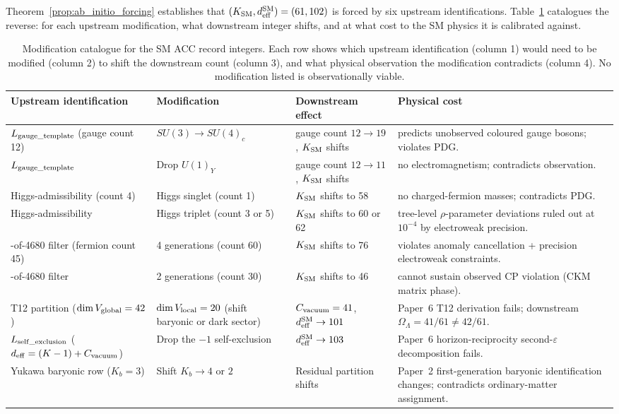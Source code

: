 \documentclass[11pt]{article}
\theoremstyle{plain}
\theoremstyle{definition}
\theoremstyle{remark}
\begin{document}
Theorem~\ref{prop:ab_initio_forcing} establishes that $(K_{\rm SM}, d_{\rm eff}^{\rm SM}) = (61, 102)$ is forced by six upstream identifications.  Table~\ref{tab:M_modification} catalogues the reverse: for each upstream modification, what downstream integer shifts, and at what cost to the SM physics it is calibrated against.

\begin{table}[h]
\centering
\small
\setlength{\tabcolsep}{4pt}
\begin{tabularx}{\textwidth}{@{}l l l X@{}}
\toprule
\textbf{Upstream identification} & \textbf{Modification} & \textbf{Downstream effect} & \textbf{Physical cost} \\
\midrule
$L_{\rm gauge\_template}$ (gauge count 12)
  & $SU(3) \to SU(4)_c$
  & gauge count $12 \to 19$, $K_{\rm SM}$ shifts
  & predicts unobserved coloured gauge bosons; violates PDG. \\
\addlinespace[3pt]
$L_{\rm gauge\_template}$
  & Drop $U(1)_Y$
  & gauge count $12 \to 11$, $K_{\rm SM}$ shifts
  & no electromagnetism; contradicts observation. \\
\addlinespace[3pt]
Higgs-admissibility (count 4)
  & Higgs singlet (count 1)
  & $K_{\rm SM}$ shifts to 58
  & no charged-fermion masses; contradicts PDG. \\
\addlinespace[3pt]
Higgs-admissibility
  & Higgs triplet (count 3 or 5)
  & $K_{\rm SM}$ shifts to 60 or 62
  & tree-level $\rho$-parameter deviations ruled out at $10^{-4}$ by electroweak precision. \\
\addlinespace[3pt]
1-of-4680 filter (fermion count 45)
  & 4 generations (count 60)
  & $K_{\rm SM}$ shifts to 76
  & violates anomaly cancellation + precision electroweak constraints. \\
\addlinespace[3pt]
1-of-4680 filter
  & 2 generations (count 30)
  & $K_{\rm SM}$ shifts to 46
  & cannot sustain observed CP violation (CKM matrix phase). \\
\addlinespace[3pt]
T12 partition ($\dim V_{\rm global} = 42$)
  & $\dim V_{\rm local} = 20$ (shift baryonic or dark sector)
  & $C_{\rm vacuum} = 41$, $d_{\rm eff}^{\rm SM} \to 101$
  & Paper~6 T12 derivation fails; downstream $\Omega_\Lambda = 41/61 \neq 42/61$. \\
\addlinespace[3pt]
$L_{\rm self\_exclusion}$ ($d_{\rm eff} = (K-1) + C_{\rm vacuum}$)
  & Drop the $-1$ self-exclusion
  & $d_{\rm eff}^{\rm SM} \to 103$
  & Paper~6 horizon-reciprocity second-$\varepsilon$ decomposition fails. \\
\addlinespace[3pt]
Yukawa baryonic row ($K_b = 3$)
  & Shift $K_b \to 4$ or $2$
  & Residual partition shifts
  & Paper~2 first-generation baryonic identification changes; contradicts ordinary-matter assignment. \\
\bottomrule
\end{tabularx}
\caption{Modification catalogue for the SM ACC record integers.  Each row shows which upstream identification (column 1) would need to be modified (column 2) to shift the downstream count (column 3), and what physical observation the modification contradicts (column 4).  No modification listed is observationally viable.}\label{tab:M_modification}
\end{table}
\end{document}
